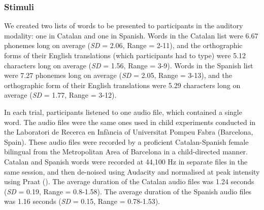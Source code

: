 \documentclass[
  man,
  longtable,
  nolmodern,
  notxfonts,
  notimes,
  colorlinks=true,linkcolor=blue,citecolor=blue,urlcolor=blue]{apa7}
\begin{document}
\subsubsection{Stimuli}\label{stimuli}

We created two lists of words to be presented to participants in the
auditory modality: one in Catalan and one in Spanish. Words in the
Catalan list were 6.67 phonemes long on average (\emph{SD} = 2.06, Range
= 2-11), and the orthographic forms of their English translations (which
participants had to type) were 5.12 characters long on average
(\emph{SD} = 1.56, Range = 3-9). Words in the Spanish list were 7.27
phonemes long on average (\emph{SD} = 2.05, Range = 3-13), and the
orthographic form of their English translations were 5.29 characters
long on average (\emph{SD} = 1.77, Range = 3-12).

In each trial, participants listened to one audio file, which contained
a single word. The audio files were the same ones used in child
experiments conducted in the Laboratori de Recerca en Infància of
Universitat Pompeu Fabra (Barcelona, Spain). These audio files were
recorded by a proficient Catalan-Spanish female bilingual from the
Metropolitan Area of Barcelona in a child-directed manner. Catalan and
Spanish words were recorded at 44,100 Hz in separate files in the same
session, and then de-noised using Audacity and normalised at peak
intensity using Praat (). The average duration of the Catalan audio files was
1.24 seconds (\emph{SD} = 0.19, Range = 0.8-1.58). The average duration
of the Spanish audio files was 1.16 seconds (\emph{SD} = 0.15, Range =
0.78-1.53).
\end{document}
